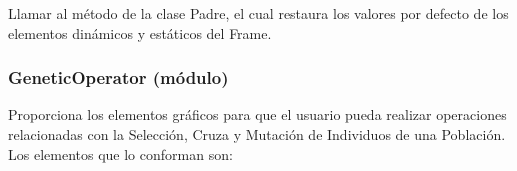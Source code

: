 \documentclass[class=report, crop=false]{standalone}
\begin{document}
\begin{fulllineitems}
\begin{fulllineitems}
\end{fulllineitems}

\begin{fulllineitems}

Llamar al método de la clase Padre, el cual restaura los 
valores por defecto de los elementos dinámicos y estáticos 
del Frame.

\end{fulllineitems}

\end{fulllineitems}

\subsubsection{GeneticOperator (módulo)}
\label{sec:a_3_2_5}
Proporciona los elementos gráficos para que el usuario pueda
realizar operaciones relacionadas con la Selección, Cruza 
y Mutación de Individuos de una Población.\medskip\break
Los elementos que lo conforman son:

\end{document}

